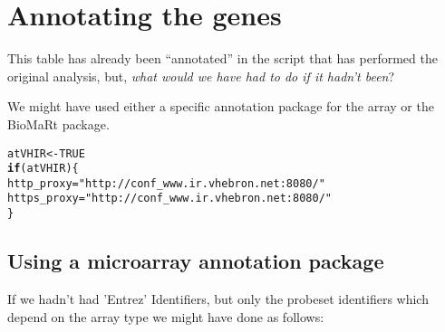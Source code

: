 \documentclass{article}\usepackage[]{graphicx}\usepackage[]{color}
\makeatletter
\newcommand{\hlnum}[1]{\textcolor[rgb]{0.686,0.059,0.569}{#1}}%
\newcommand{\hlstr}[1]{\textcolor[rgb]{0.192,0.494,0.8}{#1}}%
\newcommand{\hlstd}[1]{\textcolor[rgb]{0.345,0.345,0.345}{#1}}%
\newcommand{\hlkwa}[1]{\textcolor[rgb]{0.161,0.373,0.58}{\textbf{#1}}}%
\newcommand{\hlkwb}[1]{\textcolor[rgb]{0.69,0.353,0.396}{#1}}%
\newenvironment{kframe}{%
 \def\at@end@of@kframe{}%
 \ifinner\ifhmode%
  \def\at@end@of@kframe{\end{minipage}}%
  \begin{minipage}{\columnwidth}%
 \fi\fi%
 \def\FrameCommand##1{\hskip\@totalleftmargin \hskip-\fboxsep
 \colorbox{shadecolor}{##1}\hskip-\fboxsep
     \hskip-\linewidth \hskip-\@totalleftmargin \hskip\columnwidth}%
 \MakeFramed {\advance\hsize-\width
   \@totalleftmargin\z@ \linewidth\hsize
   \@setminipage}}%
 {\par\unskip\endMakeFramed%
 \at@end@of@kframe}
\newenvironment{knitrout}{}{} %
\makeatother
\begin{document}
\section{Annotating the genes}

This table has already been ``annotated'' in the script that has
performed the original analysis, but, \emph{what would we have had to do if
it hadn't been}?

We might have used either a specific annotation package for the array
or the BioMaRt package.

\begin{knitrout}
\color{fgcolor}\begin{kframe}
\begin{alltt}
\hlstd{atVHIR} \hlkwb{<-} \hlnum{TRUE}
\hlkwa{if} \hlstd{(atVHIR)\{}
    \hlstd{http_proxy}\hlkwb{=}\hlstr{"http://conf_www.ir.vhebron.net:8080/"}
    \hlstd{https_proxy}\hlkwb{=}\hlstr{"http://conf_www.ir.vhebron.net:8080/"}
    \hlstd{\}}
\end{alltt}
\end{kframe}
\end{knitrout}

\subsection{Using a microarray annotation package}

If we hadn't had 'Entrez' Identifiers, but only the probeset identifiers which depend on the array type we might have done as follows:
\end{document}
